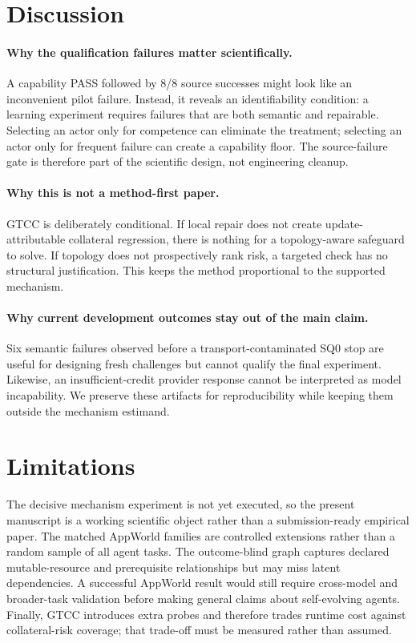 \documentclass{article}
\begin{document}
\section{Discussion}
\label{sec:discussion}
\paragraph{Why the qualification failures matter scientifically.}
A capability PASS followed by 8/8 source successes might look like an inconvenient pilot failure. Instead, it reveals an identifiability condition: a learning experiment requires failures that are both semantic and repairable. Selecting an actor only for competence can eliminate the treatment; selecting an actor only for frequent failure can create a capability floor. The source-failure gate is therefore part of the scientific design, not engineering cleanup.

\paragraph{Why this is not a method-first paper.}
GTCC is deliberately conditional. If local repair does not create update-attributable collateral regression, there is nothing for a topology-aware safeguard to solve. If topology does not prospectively rank risk, a targeted check has no structural justification. This keeps the method proportional to the supported mechanism.

\paragraph{Why current development outcomes stay out of the main claim.}
Six semantic failures observed before a transport-contaminated SQ0 stop are useful for designing fresh challenges but cannot qualify the final experiment. Likewise, an insufficient-credit provider response cannot be interpreted as model incapability. We preserve these artifacts for reproducibility while keeping them outside the mechanism estimand.

\section{Limitations}
The decisive mechanism experiment is not yet executed, so the present manuscript is a working scientific object rather than a submission-ready empirical paper. The matched AppWorld families are controlled extensions rather than a random sample of all agent tasks. The outcome-blind graph captures declared mutable-resource and prerequisite relationships but may miss latent dependencies. A successful AppWorld result would still require cross-model and broader-task validation before making general claims about self-evolving agents. Finally, GTCC introduces extra probes and therefore trades runtime cost against collateral-risk coverage; that trade-off must be measured rather than assumed.
\end{document}
